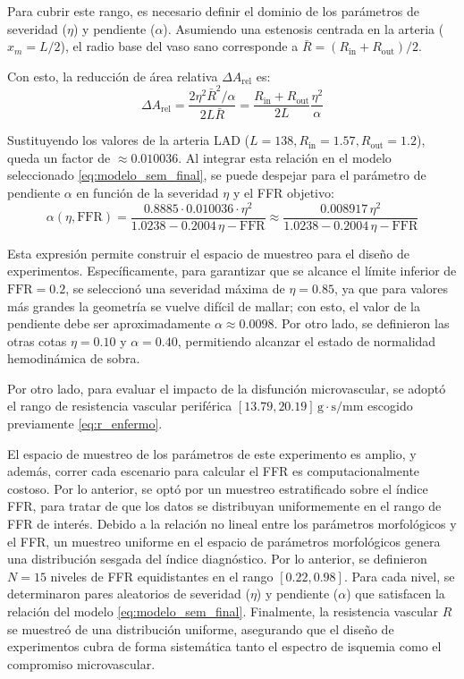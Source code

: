 \documentclass[12pt, letterpaper]{article}
\begin{document}
Para cubrir este rango, es necesario definir el dominio de los parámetros de severidad ($\eta$) y pendiente ($\alpha$). Asumiendo una estenosis centrada en la arteria ($x_m = L/2$), el radio base del vaso sano corresponde a $\bar{R} = (R_{\mathrm{in}} + R_{\mathrm{out}})/2$. 

Con esto, la reducción de área relativa $\Delta A_{\text{rel}}$ es:
\begin{equation}
  \Delta A_{\text{rel}} = \frac{2 \eta^2 \bar{R}^2 / \alpha}{2 L \bar{R}} = \frac{R_{\mathrm{in}} + R_{\mathrm{out}}}{2 L} \frac{\eta^2}{\alpha}
\end{equation}

Sustituyendo los valores de la arteria LAD ($L=138, R_{\mathrm{in}}=1.57, R_{\mathrm{out}}=1.2$), queda un factor de $\approx 0.010036$. Al integrar esta relación en el modelo seleccionado \eqref{eq:modelo_sem_final}, se puede despejar para el parámetro de pendiente $\alpha$ en función de la severidad $\eta$ y el FFR objetivo:
\begin{equation}
  \alpha(\eta, \text{FFR}) = \frac{0.8885 \cdot 0.010036 \cdot \eta^2}{1.0238 - 0.2004\,\eta - \text{FFR}} \approx \frac{0.008917\,\eta^2}{1.0238 - 0.2004\,\eta - \text{FFR}}
\end{equation}

Esta expresión permite construir el espacio de muestreo para el diseño de experimentos. Específicamente, para garantizar que se alcance el límite inferior de $\text{FFR}=0.2$, se seleccionó una severidad máxima de $\eta=0.85$, ya que para valores más grandes la geometría se vuelve difícil de mallar; con esto, el valor de la pendiente debe ser aproximadamente $\alpha \approx 0.0098$. Por otro lado, se definieron las otras cotas $\eta = 0.10$ y $\alpha = 0.40$, permitiendo alcanzar el estado de normalidad hemodinámica de sobra.

Por otro lado, para evaluar el impacto de la disfunción microvascular, se adoptó el rango de resistencia vascular periférica $[13.79, 20.19]\,\mathrm{g \cdot s/mm}$ escogido previamente \eqref{eq:r_enfermo}.

El espacio de muestreo de los parámetros de este experimento es amplio, y además, correr cada escenario para calcular el FFR es computacionalmente costoso. Por lo anterior, se optó por un muestreo estratificado sobre el índice FFR, para tratar de que los datos se distribuyan uniformemente en el rango de FFR de interés. Debido a la relación no lineal entre los parámetros morfológicos y el FFR, un muestreo uniforme en el espacio de parámetros morfológicos genera una distribución sesgada del índice diagnóstico. Por lo anterior, se definieron $N=15$ niveles de FFR equidistantes en el rango $[0.22, 0.98]$. Para cada nivel, se determinaron pares aleatorios de severidad ($\eta$) y pendiente ($\alpha$) que satisfacen la relación del modelo \eqref{eq:modelo_sem_final}. Finalmente, la resistencia vascular $R$ se muestreó de una distribución uniforme, asegurando que el diseño de experimentos cubra de forma sistemática tanto el espectro de isquemia como el compromiso microvascular.
\end{document}
